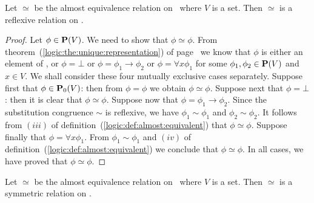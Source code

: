\begin{prop}\label{logic:prop:almost:reflexive}
Let $\simeq$ be the almost equivalence relation on \pv\ where $V$ is
a set. Then $\simeq$ is a reflexive relation on \pv.
\end{prop}
\begin{proof}
Let $\phi\in\mbox{${\bf P}(V)$}$. We need to show that $\phi\simeq\phi$. From
theorem~(\ref{logic:the:unique:representation}) of
page~\pageref{logic:the:unique:representation} we know that $\phi$
is either an element of \pvo, or $\phi=\bot$ or
$\phi=\phi_{1}\to\phi_{2}$ or $\phi=\forall x\phi_{1}$ for some
$\phi_{1},\phi_{2}\in\mbox{${\bf P}(V)$}$ and $x\in V$. We shall consider these four
mutually exclusive cases separately. Suppose first that
$\phi\in\mbox{${\bf P}_{0}(V)$}$: then from $\phi=\phi$ we obtain $\phi\simeq\phi$.
Suppose next that $\phi=\bot$: then it is clear that
$\phi\simeq\phi$. Suppose now that $\phi=\phi_{1}\to\phi_{2}$. Since
the substitution congruence $\sim$ is reflexive, we have
$\phi_{1}\sim\phi_{1}$ and $\phi_{2}\sim\phi_{2}$. It follows from
$(iii)$ of definition~(\ref{logic:def:almost:equivalent}) that
$\phi\simeq\phi$. Suppose finally that $\phi=\forall x\phi_{1}$.
From $\phi_{1}\sim\phi_{1}$ and $(iv)$ of
definition~(\ref{logic:def:almost:equivalent}) we conclude that
$\phi\simeq\phi$. In all cases, we have proved that
$\phi\simeq\phi$.
\end{proof}
\begin{prop}\label{logic:prop:almost:symmetric}
Let $\simeq$ be the almost equivalence relation on \pv\ where $V$ is
a set. Then $\simeq$ is a symmetric relation on \pv.
\end{prop}
